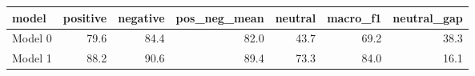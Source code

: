 \begin{tabular}{lrrrrrr}
\toprule
  model &  positive &  negative &  pos\_neg\_mean &  neutral &  macro\_f1 &  neutral\_gap \\
\midrule
Model 0 &      79.6 &      84.4 &          82.0 &     43.7 &      69.2 &         38.3 \\
Model 1 &      88.2 &      90.6 &          89.4 &     73.3 &      84.0 &         16.1 \\
\bottomrule
\end{tabular}
